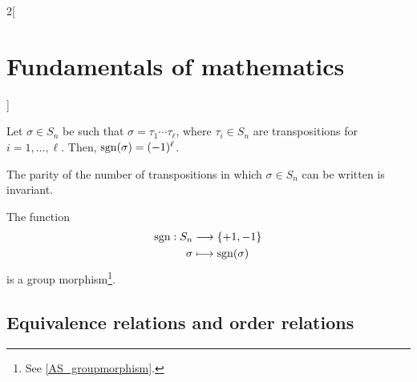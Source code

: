 \documentclass[../../../main.tex]{subfiles}
\begin{document}
\begin{multicols}{2}[\section{Fundamentals of mathematics}]
\begin{theorem}
  \end{theorem}
  \begin{corollary}
    Let $\sigma\in S_n$ be such that $\sigma=\tau_1\cdots\tau_\ell$, where $\tau_i\in S_n$ are transpositions for $i=1,\ldots,\ell$. Then, $\operatorname{sgn}(\sigma)=(-1)^\ell$.
  \end{corollary}
  \begin{corollary}
    The parity of the number of transpositions in which $\sigma\in S_n$ can be written is invariant.
  \end{corollary}
  \begin{corollary}
    The function
    \begin{align*}
      \operatorname{sgn}:S_n & \longrightarrow\{+1,-1\} \\
      \sigma    & \longmapsto\operatorname{sgn}(\sigma)
    \end{align*}
    is a group morphism\footnote{See \cref{AS_groupmorphism}.}.
  \end{corollary}
  \subsection{Equivalence relations and order relations}

\end{multicols}
\end{document}
